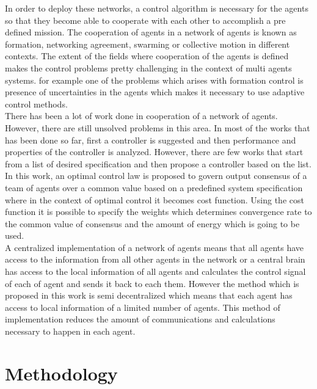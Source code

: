 \documentclass[conference]{IEEEtran}
\begin{document}
In order to deploy these networks, a control algorithm is necessary for the agents so that they become able to cooperate with each other to accomplish a pre defined mission. The cooperation of agents in a network of agents is known as formation, networking agreement, swarming or collective motion in different contexts. The extent of the fields where cooperation of the agents is defined makes the control problems pretty challenging in the context of multi agents systems. for example one of the problems which arises with formation control is presence of uncertainties in the agents which makes it necessary to use adaptive control methods.\\
There has been a lot of work done in cooperation of a network of agents. However, there are still unsolved problems in this area. In most of the works that has been done so far, first a controller is suggested and then performance and properties of the controller is analyzed. However, there are few works that start from a list of desired specification and then propose a controller based on the list. In this work, an optimal control law is proposed to govern  output consensus of a team of agents over a common value based on a predefined system specification where in the context of optimal control it becomes cost function. Using the cost function it is possible to specify the weights which determines convergence rate to the common value of consensus and the amount of energy which is going to be used. \\
A centralized implementation of a network of agents means that all agents have access to the information from all other agents in the network or a central brain has access to the local information of all agents and calculates the control signal of each of agent and sends it back to each them. However the method which is proposed in this work is semi decentralized which means that each agent has access to local information of a limited number of agents. This method of implementation reduces the amount of communications and calculations necessary to happen in each agent.

\section{Methodology}
\end{document}
